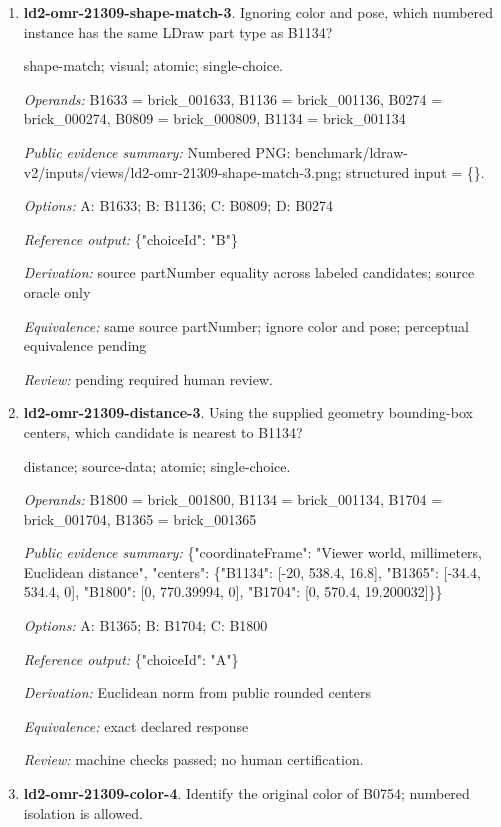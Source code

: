 \begin{enumerate}
\item \textbf{ld2-omr-21309-shape-match-3}. Ignoring color and pose, which numbered instance has the same LDraw part type as B1134?
\par{\small shape-match; visual; atomic; single-choice.\par\textit{Operands:} B1633 = brick\_001633, B1136 = brick\_001136, B0274 = brick\_000274, B0809 = brick\_000809, B1134 = brick\_001134\par\textit{Public evidence summary:} Numbered PNG: benchmark/ldraw-v2/inputs/views/ld2-omr-21309-shape-match-3.png; structured input = \{\}.\par\textit{Options:} A: B1633; B: B1136; C: B0809; D: B0274\par\textit{Reference output:} \{"choiceId": "B"\}\par\textit{Derivation:} source partNumber equality across labeled candidates; source oracle only\par\textit{Equivalence:} same source partNumber; ignore color and pose; perceptual equivalence pending\par\textit{Review:} pending required human review.}
\item \textbf{ld2-omr-21309-distance-3}. Using the supplied geometry bounding-box centers, which candidate is nearest to B1134?
\par{\small distance; source-data; atomic; single-choice.\par\textit{Operands:} B1800 = brick\_001800, B1134 = brick\_001134, B1704 = brick\_001704, B1365 = brick\_001365\par\textit{Public evidence summary:} \{"coordinateFrame": "Viewer world, millimeters, Euclidean distance", "centers": \{"B1134": [-20, 538.4, 16.8], "B1365": [-34.4, 534.4, 0], "B1800": [0, 770.39994, 0], "B1704": [0, 570.4, 19.200032]\}\}\par\textit{Options:} A: B1365; B: B1704; C: B1800\par\textit{Reference output:} \{"choiceId": "A"\}\par\textit{Derivation:} Euclidean norm from public rounded centers\par\textit{Equivalence:} exact declared response\par\textit{Review:} machine checks passed; no human certification.}
\item \textbf{ld2-omr-21309-color-4}. Identify the original color of B0754; numbered isolation is allowed.

\end{enumerate}
